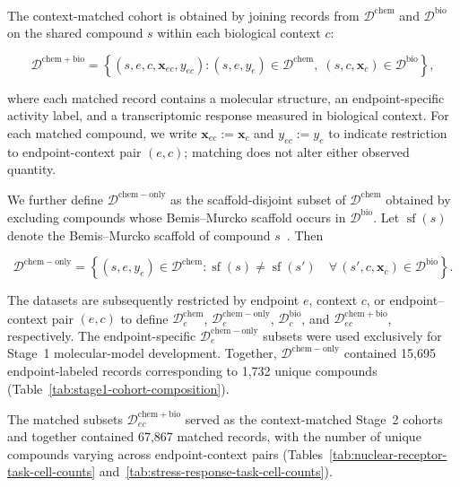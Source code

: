 \documentclass[11pt,a4paper]{article}
\begin{document}
The context-matched cohort is obtained by joining records from
$\mathcal D^{\mathrm{chem}}$ and $\mathcal D^{\mathrm{bio}}$ on the
shared compound $s$ within each biological context $c$:

\begin{equation}
\mathcal D^{\mathrm{chem+bio}}
=
\left\{
(s,e,c,\mathbf x_{ec},y_{ec})
:
(s,e,y_e)\in\mathcal D^{\mathrm{chem}},
\;
(s,c,\mathbf x_c)\in\mathcal D^{\mathrm{bio}}
\right\},
\label{eq:chem+bio-dataset}
\end{equation}

where each matched record contains a molecular structure, an
endpoint-specific activity label, and a transcriptomic response measured
in biological context. For each matched compound, we write
$\mathbf x_{ec}:=\mathbf x_c$ and $y_{ec}:=y_e$ to indicate restriction
to endpoint-context pair $(e,c)$; matching does not alter either
observed quantity.

We further define
\(\mathcal D^{\mathrm{chem-only}}\)
as the scaffold-disjoint subset of \(\mathcal D^{\mathrm{chem}}\) obtained by excluding compounds whose Bemis--Murcko scaffold occurs in \(\mathcal D^{\mathrm{bio}}\). Let $\operatorname{sf}(s)$ denote
the Bemis--Murcko scaffold of compound $s$~\cite{bemis1996properties}. Then

\begin{equation}
\mathcal D^{\mathrm{chem-only}}
=
\left\{
(s,e,y_e)\in\mathcal D^{\mathrm{chem}}
:
\operatorname{sf}(s)\neq\operatorname{sf}(s')
\quad
\forall\,
(s',c,\mathbf x_c)\in\mathcal D^{\mathrm{bio}}
\right\}.
\label{eq:chem-only-dataset}
\end{equation}

The datasets are subsequently restricted by endpoint $e$, context $c$,
or endpoint--context pair $(e,c)$ to define
$\mathcal D^{\mathrm{chem}}_e$,
$\mathcal D^{\mathrm{chem-only}}_e$,
$\mathcal D^{\mathrm{bio}}_c$, and
$\mathcal D^{\mathrm{chem+bio}}_{ec}$, respectively.
The endpoint-specific
$\mathcal D^{\mathrm{chem-only}}_e$ subsets were used exclusively for
Stage~1 molecular-model development. Together,
$\mathcal D^{\mathrm{chem-only}}$ contained 15,695 endpoint-labeled
records corresponding to 1,732 unique compounds
(Table~\ref{tab:stage1-cohort-composition}).

The matched subsets
$\mathcal D^{\mathrm{chem+bio}}_{ec}$ served as the context-matched
Stage~2 cohorts and together contained 67,867 matched records, with the
number of unique compounds varying across endpoint-context pairs
(Tables~\ref{tab:nuclear-receptor-task-cell-counts}
and~\ref{tab:stress-response-task-cell-counts}).
\end{document}
